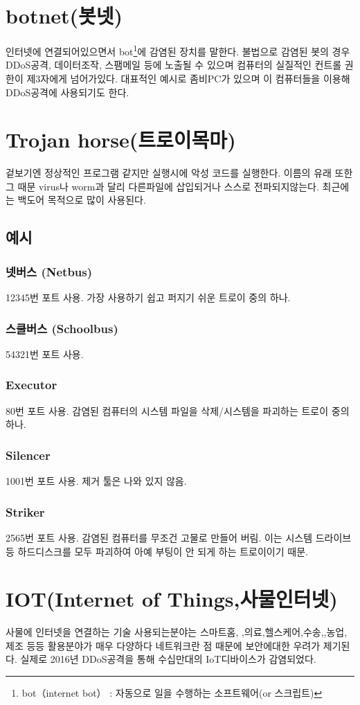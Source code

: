 \documentclass{oblivoir}
\begin{document}
\section{botnet(봇넷)}
인터넷에 연결되어있으면서 bot\footnote{bot（internet bot） : 자동으로 일을 수행하는 소프트웨어(or 스크립트)}에 감염된 장치를 말한다.
불법으로 감염된 봇의 경우 DDoS공격, 데이터조작, 스팸메일 등에 노출될 수 있으며 컴퓨터의 실질적인 컨트롤 권한이 제3자에게 넘어가있다.  대표적인 예시로 좀비PC가 있으며 이 컴퓨터들을 이용해 DDoS공격에 사용되기도 한다.
\section{Trojan horse(트로이목마)}
겉보기엔 정상적인 프로그램 같지만 실행시에 악성 코드를 실행한다. 이름의 유래 또한 그 때문 virus나 worm과 달리 다른파일에 삽입되거나 스스로 전파되지않는다. 최근에는 백도어 목적으로 많이 사용된다.
\subsection{예시}

\subsubsection{넷버스 (Netbus)}12345번 포트 사용. 가장 사용하기 쉽고 퍼지기 쉬운 트로이 중의 하나.
\subsubsection{스쿨버스 (Schoolbus)}
54321번 포트 사용.
\subsubsection{Executor}
80번 포트 사용. 감염된 컴퓨터의 시스템 파일을 삭제/시스템을 파괴하는 트로이 중의 하나.
\subsubsection{Silencer}
1001번 포트 사용. 제거 툴은 나와 있지 않음.
\subsubsection{Striker}
2565번 포트 사용. 감염된 컴퓨터를 무조건 고물로 만들어 버림. 이는 시스템 드라이브 등 하드디스크를 모두 파괴하여 아예 부팅이 안 되게 하는 트로이이기 때문.


\section{IOT(Internet of Things,사물인터넷)}
사물에 인터넷을 연결하는 기술 \newline 사용되는분야는 스마트홈, ,의료,헬스케어,수송,,농업, 제조 등등 활용분야가 매우 다양하다
네트워크란 점 때문에 보안에대한 우려가 제기된다. 실제로 2016년 DDoS공격을 통해 수십만대의 IoT디바이스가 감염되었다.
\end{document}
